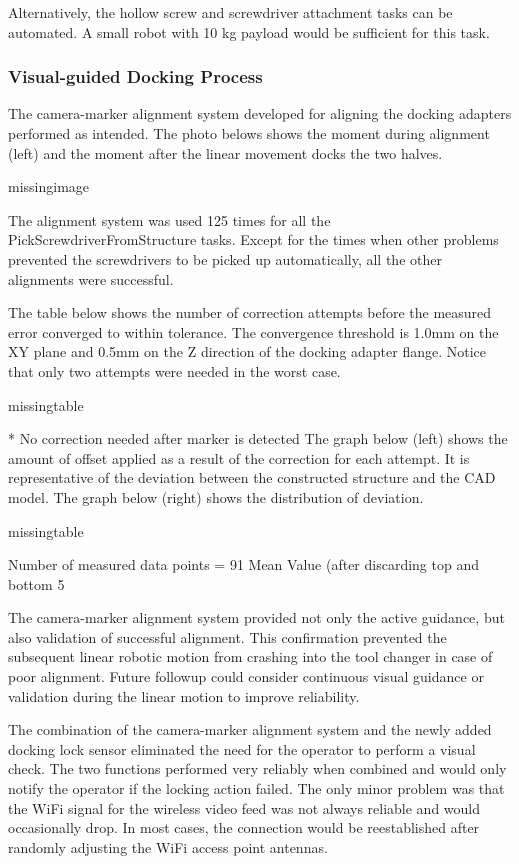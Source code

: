 Alternatively, the hollow screw and screwdriver attachment tasks can be automated. A small robot with 10 kg payload would be sufficient for this task.

\subsubsection{Visual-guided Docking Process}
The camera-marker alignment system developed for aligning the docking adapters performed as intended. The photo belows shows the moment during alignment (left) and the moment after the linear movement docks the two halves. 

missingimage

The alignment system was used 125 times for all the PickScrewdriverFromStructure tasks. Except for the times when other problems prevented the screwdrivers to be picked up automatically, all the other alignments were successful.

The table below shows the number of correction attempts before the measured error converged to within tolerance. The convergence threshold is 1.0mm on the XY plane and 0.5mm on the Z direction of the docking adapter flange. Notice that only two attempts were needed in the worst case.

missingtable

* No correction needed after marker is detected
The graph below (left) shows the amount of offset applied as a result of the correction for each attempt. It is representative of the deviation between the constructed structure and the CAD model. The graph below (right) shows the distribution of deviation.

missingtable

Number of measured data points = 91
Mean Value (after discarding top and bottom 5%

The camera-marker alignment system provided not only the active guidance, but also validation of successful alignment. This confirmation prevented the subsequent linear robotic motion from crashing into the tool changer in case of poor alignment. Future followup could consider continuous visual guidance or validation during the linear motion to improve reliability.

The combination of the camera-marker alignment system and the newly added docking lock sensor eliminated the need for the operator to perform a visual check. The two functions performed very reliably when combined and would only notify the operator if the locking action failed. The only minor problem was that the WiFi signal for the wireless video feed was not always reliable and would occasionally drop. In most cases, the connection would be reestablished after randomly adjusting the WiFi access point antennas. 

